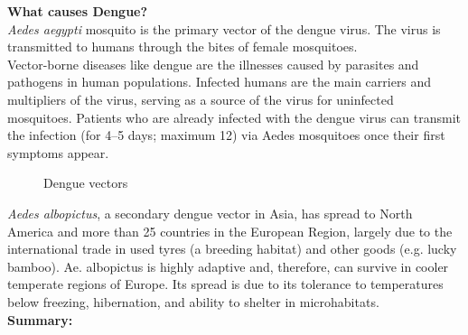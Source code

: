 \documentclass[11pt]{exam}
\begin{document}
\begin{questions}
\question
\label{3. Dengue cause }
\textbf{What causes Dengue?}\\
\textbf{}
\textit{Aedes aegypti} mosquito is the primary vector of the dengue virus. The virus is transmitted to humans through the bites of female mosquitoes. \\
Vector-borne diseases like dengue are the illnesses caused by parasites and pathogens in human populations. Infected humans are the main carriers and multipliers of the virus, serving as a source of the virus for uninfected mosquitoes. Patients who are already infected with the dengue virus can transmit the infection (for 4–5 days; maximum 12) via Aedes mosquitoes once their first symptoms appear. \\ 

\begin{figure}[H]
  \centering
  \hfill
  \caption{Dengue vectors}
  \label{Dengue vectors }
\end{figure} 

\textit{Aedes albopictus}, a secondary dengue vector in Asia, has spread to North America and more than 25 countries in the European Region, largely due to the international trade in used tyres (a breeding habitat) and other goods (e.g. lucky bamboo). Ae. albopictus is highly adaptive and, therefore, can survive in cooler temperate regions of Europe. Its spread is due to its tolerance to temperatures below freezing, hibernation, and ability to shelter in microhabitats.\\
\textbf{Summary:} \\
\\ \\


\end{questions}
\end{document}

